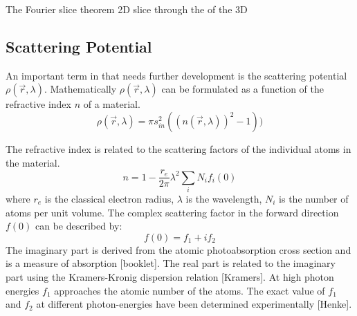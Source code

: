 The Fourier slice theorem \DIFdelbegin {}\DIFdelend \DIFaddbegin {}\DIFaddend 2D \DIFdelbegin {}\DIFdelend \DIFaddbegin {}\DIFaddend slice through the \DIFdelbegin {}\DIFdelend \DIFaddbegin {}\DIFaddend of the 3D
\DIFdelbegin {}\DIFdelend \DIFaddbegin {}\DIFaddend 


\subsection{Scattering Potential}
An important term in \DIFdelbegin {}\DIFdelend \DIFaddbegin {}\DIFaddend that needs further
development is the scattering potential
\DIFdelbegin {}\DIFdelend $\rho(\vec{r},\lambda)$. Mathematically $\rho(\vec{r},\lambda)$ can be
formulated as a function of the refractive index $n$ of a material.
\begin{equation}
\rho(\vec{r},\lambda) = \pi s_{in}^2 (( n(\vec{r},\lambda))^2 -1))
\end{equation}
\DIFdelbegin {}\DIFdelend %

The refractive index is related to the scattering factors of the
individual atoms in the material.
\begin{equation}
n = 1-\frac{r_e}{2\pi} \lambda^{2} \sum_{i} N_i f_i(0)
\end{equation}
where $r_e$ is the classical electron radius, $\lambda$ is the
wavelength, $N_i$ is the number of atoms per unit volume. The complex
scattering factor in the forward direction $f(0)$ can be described by:
\begin{equation}
f(0) = f_1 + i f_2
\end{equation}
The imaginary part is derived from the atomic photoabsorption cross
section and is a measure of absorption [booklet]. The real part is
related to the imaginary part using the Kramers-Kronig dispersion
relation [Kramers]. At high photon energies $f_1$ approaches the
atomic number of the atoms. The exact value of $f_1$ and $f_2$ at
different photon-energies have been determined experimentally [Henke].

